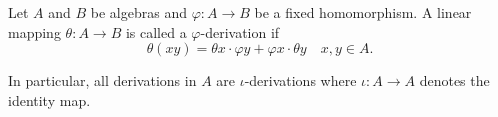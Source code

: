 Let $A$ and $B$ be algebras and $\varphi: A \to B$ be a fixed homomorphism. A linear mapping $\theta: A \to B$ is called a $\varphi$-derivation if
$$\theta(xy) = \theta x \cdot \varphi y + \varphi x \cdot \theta y \quad x, y \in A.$$

In particular, all derivations in $A$ are $\iota$-derivations where $\iota: A \to A$ denotes the identity map.
